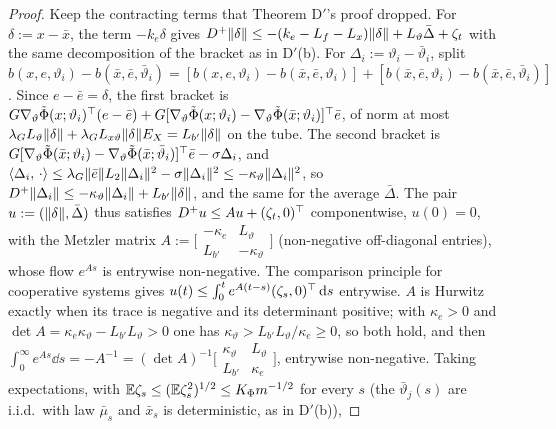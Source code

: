 \begin{proof}
Keep the contracting terms that Theorem D$'$'s proof dropped. For $\delta := x - \bar x$, the term $-k_e\delta$ gives
$D^+\lVert \delta\rVert \le -(k_e - L_f - L_x)\lVert \delta\rVert + L_\vartheta\bar\Delta + \zeta_t$ with the same decomposition
of the bracket as in D$'$(b). For $\Delta_i := \vartheta_i - \bar\vartheta_i$, split
$b(x,e,\vartheta_i) - b(\bar x,\bar e,\bar\vartheta_i)
= [b(x,e,\vartheta_i) - b(\bar x,\bar e,\vartheta_i)] + [b(\bar x,\bar e,\vartheta_i) - b(\bar x,\bar e,\bar\vartheta_i)]$.
Since $e - \bar e = \delta$, the first bracket is
$G\nabla_\vartheta\tilde\Phi(x;\vartheta_i)^\top(e - \bar e)
+ G[\nabla_\vartheta\tilde\Phi(x;\vartheta_i) - \nabla_\vartheta\tilde\Phi(\bar x;\vartheta_i)]^\top\bar e$, of norm at
most $\lambda_GL_\vartheta\lVert \delta\rVert + \lambda_GL_{x\vartheta}\lVert \delta\rVert E_X = L_{b'}\lVert \delta\rVert$ on the tube.
The second bracket is
$G[\nabla_\vartheta\tilde\Phi(\bar x;\vartheta_i) - \nabla_\vartheta\tilde\Phi(\bar x;\bar\vartheta_i)]^\top\bar e - \sigma\Delta_i$,
and $\langle \Delta_i,\, \cdot\rangle \le \lambda_G\lVert \bar e\rVert L_2\lVert \Delta_i\rVert^2 - \sigma\lVert \Delta_i\rVert^2
\le -\kappa_\vartheta\lVert \Delta_i\rVert^2$, so
$D^+\lVert \Delta_i\rVert \le -\kappa_\vartheta\lVert \Delta_i\rVert + L_{b'}\lVert \delta\rVert$, and the same for the average
$\bar\Delta$. The pair $u := (\lVert \delta\rVert,\bar\Delta)$ thus satisfies $D^+u \le Au + (\zeta_t,0)^\top$ componentwise,
$u(0) = 0$, with the Metzler matrix
$A := \bigl[\begin{smallmatrix}-\kappa_e & L_\vartheta\\ L_{b'} & -\kappa_\vartheta\end{smallmatrix}\bigr]$
(non-negative off-diagonal entries), whose flow $e^{As}$ is entrywise non-negative. The comparison principle for
cooperative systems gives $u(t) \le \int_0^te^{A(t-s)}(\zeta_s,0)^\top\,\mathrm{d} s$ entrywise. $A$ is Hurwitz exactly when its
trace is negative and its determinant positive; with $\kappa_e > 0$ and
$\det A = \kappa_e\kappa_\vartheta - L_{b'}L_\vartheta > 0$ one has $\kappa_\vartheta > L_{b'}L_\vartheta/\kappa_e \ge 0$,
so both hold, and then
$\int_0^\infty e^{As}\dd s = -A^{-1}
= (\det A)^{-1}\bigl[\begin{smallmatrix}\kappa_\vartheta & L_\vartheta\\ L_{b'} & \kappa_e\end{smallmatrix}\bigr]$,
entrywise non-negative. Taking expectations, with $\mathbb{E}\zeta_s \le (\mathbb{E}\zeta_s^2)^{1/2} \le K_\Phi m^{-1/2}$ for every
$s$ (the $\bar\vartheta_j(s)$ are i.i.d.\ with law $\bar\mu_s$ and $\bar x_s$ is deterministic, as in D$'$(b)),

\end{proof}
